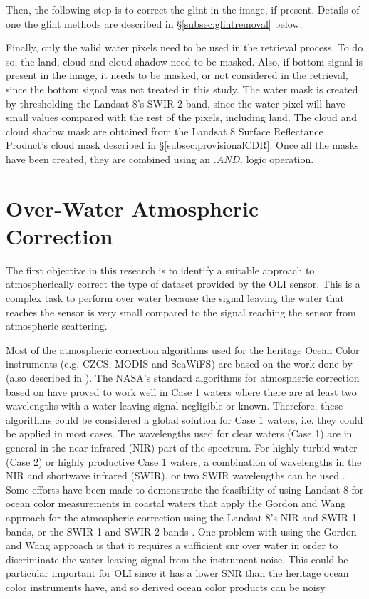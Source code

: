 Then, the following step is to correct the glint in the image, if present. Details of one the glint methods are described in \S\ref{subsec:glintremoval} below.

Finally, only the valid water pixels need to be used in the retrieval process. To do so, the land, cloud and cloud shadow need to be masked. Also, if bottom signal is present in the image, it needs to be masked, or not considered in the retrieval, since the bottom signal was not treated in this study. The water mask is created by thresholding the Landsat 8's SWIR 2 band, since the water pixel will have small values compared with the rest of the pixels, including land. The cloud and cloud shadow mask are obtained from the Landsat 8 Surface Reflectance Product's \cite{L8SurfProduct2015} cloud mask described in \S\ref{subsec:provisionalCDR}. Once all the masks have been created, they are combined using an $.AND.$ logic operation.

\section{Over-Water Atmospheric Correction} 
\label{sec:atmcorr}
The first objective in this research is to identify a suitable approach to atmospherically correct the type of dataset provided by the OLI sensor. This is a complex task to perform over water because the signal leaving the water that reaches the sensor is very small compared to the signal reaching the sensor from atmospheric scattering. 

Most of the atmospheric correction algorithms used for the heritage Ocean Color instruments (e.g. CZCS, MODIS and SeaWiFS) are based on the work done by \cite{Gordon:1994} (also described in \cite{Gordon:1997}). The NASA's standard algorithms for atmospheric correction based on \cite{Gordon:1994} have proved to work well in Case 1 waters where there are at least two wavelengths with a water-leaving signal negligible or known. Therefore, these algorithms could be considered a global solution for Case 1 waters, i.e. they could be applied in most cases. The wavelengths used for clear waters (Case 1) are in general in the near infrared (NIR) part of the spectrum. For highly turbid water (Case 2) or highly productive Case 1 waters, a combination of wavelengths in the NIR and shortwave infrared (SWIR), or two SWIR wavelengths can be used \cite{Wang:2007,Wang:2007dz,Wang2009}. Some efforts have been made to demonstrate the feasibility of using Landsat 8 for ocean color measurements in coastal waters that apply the Gordon and Wang approach for the atmospheric correction using the Landsat 8's NIR and SWIR 1 bands, or the SWIR 1 and SWIR 2 bands \cite{Vanhellemont2014a,Vanhellemont2014,Vanhellemont:2015,Franz:2015}. One problem with using the Gordon and Wang approach is that it requires a sufficient \gls{snr} over water in order to discriminate the water-leaving signal from the instrument noise. This could be particular important for OLI since it has a lower SNR than the heritage ocean color instruments have, and so derived ocean color products can be noisy.

